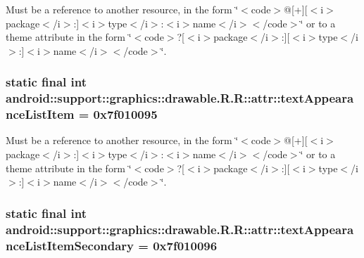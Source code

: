 Must be a reference to another resource, in the form \char`\"{}$<$code$>$@\mbox{[}+\mbox{]}\mbox{[}$<$i$>$package$<$/i$>$:\mbox{]}$<$i$>$type$<$/i$>$:$<$i$>$name$<$/i$>$$<$/code$>$\char`\"{} or to a theme attribute in the form \char`\"{}$<$code$>$?\mbox{[}$<$i$>$package$<$/i$>$:\mbox{]}\mbox{[}$<$i$>$type$<$/i$>$:\mbox{]}$<$i$>$name$<$/i$>$$<$/code$>$\char`\"{}. \hypertarget{classandroid_1_1support_1_1graphics_1_1drawable_1_1_r_1_1attr_8dbb7fcd5c1f30239956484df1d88d11}{
\subsubsection[{textAppearanceListItem}]{\setlength{\rightskip}{0pt plus 5cm}static final int android::support::graphics::drawable.R.R::attr::textAppearanceListItem = 0x7f010095}}
\label{classandroid_1_1support_1_1graphics_1_1drawable_1_1_r_1_1attr_8dbb7fcd5c1f30239956484df1d88d11}


Must be a reference to another resource, in the form \char`\"{}$<$code$>$@\mbox{[}+\mbox{]}\mbox{[}$<$i$>$package$<$/i$>$:\mbox{]}$<$i$>$type$<$/i$>$:$<$i$>$name$<$/i$>$$<$/code$>$\char`\"{} or to a theme attribute in the form \char`\"{}$<$code$>$?\mbox{[}$<$i$>$package$<$/i$>$:\mbox{]}\mbox{[}$<$i$>$type$<$/i$>$:\mbox{]}$<$i$>$name$<$/i$>$$<$/code$>$\char`\"{}. \hypertarget{classandroid_1_1support_1_1graphics_1_1drawable_1_1_r_1_1attr_f77248764802565f6d9ee3355f613330}{
\subsubsection[{textAppearanceListItemSecondary}]{\setlength{\rightskip}{0pt plus 5cm}static final int android::support::graphics::drawable.R.R::attr::textAppearanceListItemSecondary = 0x7f010096}}
\label{classandroid_1_1support_1_1graphics_1_1drawable_1_1_r_1_1attr_f77248764802565f6d9ee3355f613330}


